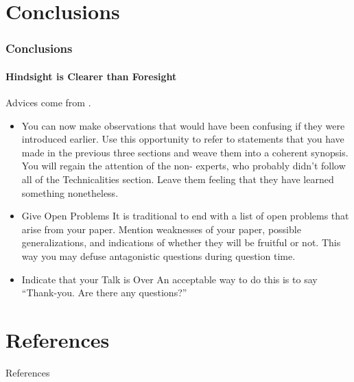 \documentclass[11pt]{beamer}              %
\begin{document}
\section{Conclusions}
\begin{frame}
\frametitle{Conclusions}
\framesubtitle{Hindsight is Clearer than Foresight}
Advices come from \cite{spillman2000present}.
\begin{itemize}
\item You can now make observations that would have been confusing if they were introduced earlier. Use this opportunity to refer to statements that you have made in the previous three sections and weave them into a coherent synopsis. You will regain the attention of the non- experts, who probably didn’t follow all of the Technicalities section. Leave them feeling that they have learned something nonetheless.
\item Give Open Problems It is traditional to end with a list of open problems that arise from your paper. Mention weaknesses of your paper, possible generalizations, and indications of whether they will be fruitful or not. This way you may defuse antagonistic questions during question time.
\item Indicate that your Talk is Over
An acceptable way to do this is to say “Thank-you. Are there any questions?”\cite{einstein}
\end{itemize}

\end{frame}

\section*{References}
\begin{frame}{References}
\tiny


\end{frame}
\end{document}
